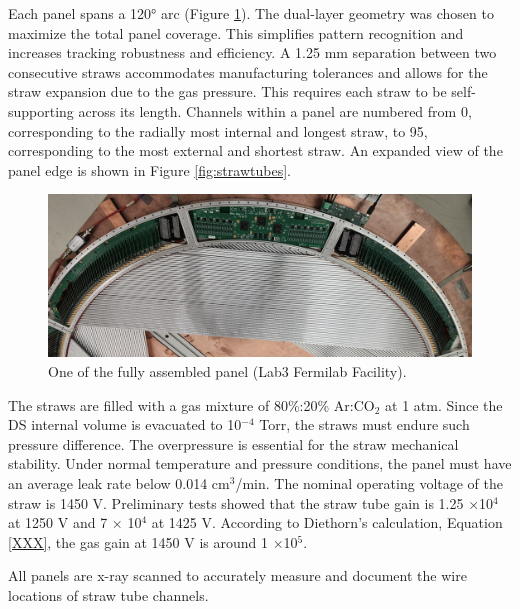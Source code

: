 Each panel spans a 120° arc (Figure \ref{fig:gonzalo}).
The dual-layer geometry was chosen to maximize the total panel coverage. 
This simplifies pattern recognition and increases tracking robustness and efficiency. 
A 1.25 mm separation between two consecutive straws accommodates 
manufacturing tolerances and allows for the straw expansion
due to the gas pressure. This requires each straw to be self-supporting across its 
length. Channels within a panel are numbered from 0, 
corresponding to the radially most internal and longest straw, 
to 95, corresponding to the most external and shortest straw. 
An expanded view 
of the panel edge is shown in Figure \ref{fig:strawtubes}.
            \begin{figure}[!h]
                \centering
                \includegraphics[width =\textwidth]{figures/png/image.png}
                \caption[One of the fully assembled panel.]{One of the fully assembled panel (Lab3 Fermilab Facility).}
                \label{fig:gonzalo}
                \end{figure}

            The straws are filled with a gas mixture of 80\%:20\% Ar:CO$_2$ at 1 atm.
            Since the DS internal volume is evacuated to 10$^{-4}$ Torr, 
            the straws must endure such pressure difference.
            The overpressure is essential for the straw mechanical stability. 
            Under normal temperature and 
            pressure conditions, the panel must have an average leak rate below 0.014 cm$^3$/min.  
            The nominal operating voltage of the straw is 1450 V. 
            Preliminary tests showed that the straw 
            tube gain is 1.25 $\times$10$^4$ at 1250 V and 7 $\times$ 10$^4$ at 
            1425 V. According to Diethorn's calculation, Equation \ref{XXX}, 
            the gas gain at 1450 V is around 1 $\times$10$^5$.
 

All panels are x-ray scanned 
to accurately measure and document the wire 
locations of straw tube channels. 

